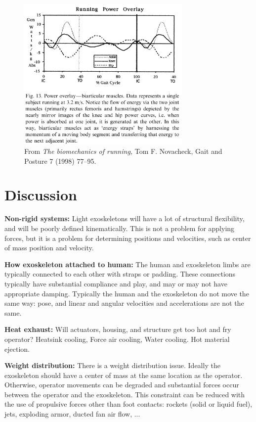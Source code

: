 \documentclass[letterpaper,12pt,fullpage]{article}
\begin{document}
\begin{figure}[t]
\centering
\includegraphics[width=0.75\textwidth]{figs/shc1}
\caption{From {\it The biomechanics of running,}
Tom F. Novacheck,
Gait and Posture 7 (1998) 77–95.}
\label{f:hip-knee}
\end{figure}

\section{Discussion}

{\bf Non-rigid systems:}
Light exoskeletons will have a lot of structural flexibility,
and will be poorly defined kinematically. This is not a
problem for applying forces, but it is a problem for determining
positions and velocities, such as center of mass position and velocity.

{\bf How exoskeleton attached to human:}
The human and exoskeleton limbs are typically connected to each
other with straps or padding. These connections typically have substantial
compliance and play, and may or may not have appropriate damping.
Typically the human and the exoskeleton do not move the same way:
pose, and linear and angular velocities and accelerations are not the same.

{\bf Heat exhaust:}
Will actuators, housing, and structure get too hot and fry operator?
Heatsink cooling, Force air cooling, Water cooling.
Hot material ejection.

{\bf Weight distribution:}
There is a weight distribution issue. Ideally the exoskeleton should
have a center of mass at the same location as the operator. Otherwise,
operator movements can be degraded and substantial forces occur between
the operator and the exoskeleton.
This constraint can be reduced with the use of propulsive forces other
than foot contacts: rockets (solid or liquid fuel), jets, exploding armor,
ducted fan air flow, ...
\end{document}
